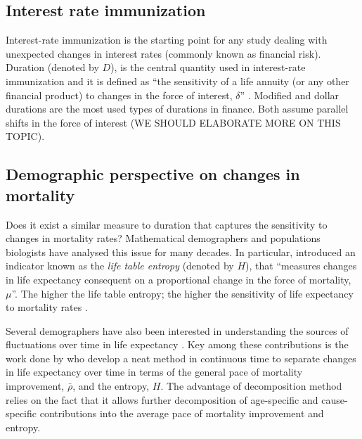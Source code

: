 \documentclass[12pt]{article}
\begin{document}
\subsection{Interest rate immunization}

Interest-rate immunization \citep{redington1951papers,fisher1971coping,shiu1990redington,santomero1997financial,courtois2007immunization} is the starting point for any study dealing with unexpected changes in interest rates (commonly known as financial risk). Duration (denoted by $D$), is the central quantity used in interest-rate immunization and it is defined as “the sensitivity of a life annuity (or any other financial product) to changes in the force of interest, $\delta$” \citep{milevsky2013life,charupat2016sluggish}. Modified and dollar durations are the most used types of durations in finance. Both assume parallel shifts in the force of interest (WE SHOULD ELABORATE MORE ON THIS TOPIC).




\subsection*{Demographic perspective on changes in mortality}

Does it exist a similar measure to duration that captures the sensitivity to changes in mortality rates?
Mathematical demographers and populations biologists \citep{leser1955variations,keyfitz1968introduction,keyfitz1977difference,demetrius1974demographic,mitra1978short,goldman1986new,Vaupel1986,hakkert1987life,fernandez2015entropy} have analysed this issue for many decades. In particular, \citet{leser1955variations,demetrius1974demographic,keyfitz1977difference} introduced an indicator known as the \textit{life table entropy} (denoted by $H$), that  “measures changes in life expectancy consequent on a proportional change in the force of mortality, $\mu$”. The higher the life table entropy; the higher the sensitivity of life expectancy to mortality rates \citep{vaupel2011life,aburto2019threshold,aburto2020dynamics}.


Several demographers have also been interested in understanding the sources of fluctuations over time in life expectancy \citep{arriaga1984measuring,pollard1988decomposition,beltran2008integrated,beltran2011unifying}. Key among these contributions is the work done by \citet{Vaupel2003} who develop a neat method in continuous time to separate changes in life expectancy over time in terms of the general pace of mortality improvement, $\bar{\rho}$, and the entropy, $H$. The advantage of \citet{Vaupel2003} decomposition method relies on the fact that it allows further decomposition of age-specific and cause-specific contributions into the average pace of mortality improvement and entropy.
\end{document}
